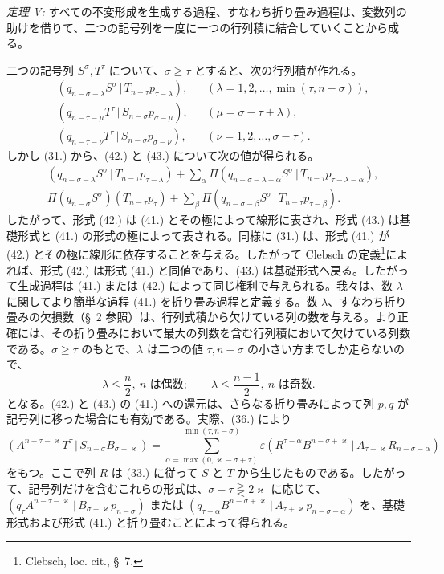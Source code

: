 \documentclass[11pt]{article}
\newcommand{\pair}[2]{(#1\,|\,#2)}
\newcommand{\eps}{\varepsilon}
\begin{document}
\emph{定理 V:} すべての不変形成を生成する過程、すなわち折り畳み過程は、変数列の助けを借りて、二つの記号列を一度に一つの行列積に結合していくことから成る。

二つの記号列 $S^\sigma,T^\tau$ について、$\sigma\ge\tau$ とすると、次の行列積が作れる。
\begin{align}
&\pair{q_{n-\sigma-\lambda}S^\sigma}{T_{n-\tau}p_{\tau-\lambda}}, &&(\lambda=1,2,\ldots,\min(\tau,n-\sigma)),\tag{41}\\
&\pair{q_{n-\tau-\mu}T^\tau}{S_{n-\sigma}p_{\sigma-\mu}}, &&(\mu=\sigma-\tau+\lambda),\tag{42}\\
&\pair{q_{n-\tau-\nu}T^\tau}{S_{n-\sigma}p_{\sigma-\nu}}, &&(\nu=1,2,\ldots,\sigma-\tau).
\tag{43}
\end{align}
しかし (31.) から、(42.) と (43.) について次の値が得られる。
\begin{align}
&\pair{q_{n-\sigma-\lambda}S^\sigma}{T_{n-\tau}p_{\tau-\lambda}}
 +\sum_{\alpha}\Pi\pair{q_{n-\sigma-\lambda-\alpha}S^\sigma}{T_{n-\tau}p_{\tau-\lambda-\alpha}},\tag{42a}\\
&\Pi(q_{n-\sigma}S^\sigma)(T_{n-\tau}p_\tau)
 +\sum_{\beta}\Pi\pair{q_{n-\sigma-\beta}S^\sigma}{T_{n-\tau}p_{\tau-\beta}}.
\tag{43a}
\end{align}
したがって、形式 (42.) は (41.) とその極によって線形に表され、形式 (43.) は基礎形式と (41.) の形式の極によって表される。同様に (31.) は、形式 (41.) が (42.) とその極に線形に依存することを与える。したがって Clebsch の定義\footnote{Clebsch, loc. cit., \S\ 7.}によれば、形式 (42.) は形式 (41.) と同値であり、(43.) は基礎形式へ戻る。したがって生成過程は (41.) または (42.) によって同じ権利で与えられる。我々は、数 $\lambda$ に関してより簡単な過程 (41.) を折り畳み過程と定義する。数 $\lambda$、すなわち折り畳みの欠損数（\S\ 2 参照）は、行列式積から欠けている列の数を与える。より正確には、その折り畳みにおいて最大の列数を含む行列積において欠けている列数である。$\sigma\ge\tau$ のもとで、$\lambda$ は二つの値 $\tau,n-\sigma$ の小さい方までしか走らないので、
\begin{equation}
 \lambda\le\frac n2,\ n\text{ は偶数};\qquad
 \lambda\le\frac{n-1}{2},\ n\text{ は奇数}.
\tag{44}
\end{equation}
となる。(42.) と (43.) の (41.) への還元は、さらなる折り畳みによって列 $p,q$ が記号列に移った場合にも有効である。実際、(36.) により
\[
 \pair{A^{n-\tau-\varkappa}T^\tau}{S_{n-\sigma}B_{\sigma-\varkappa}}
 =\sum_{\alpha=\max(0,\varkappa-\sigma+\tau)}^{\min(\tau,n-\sigma)}
 \eps\pair{R^{\tau-\alpha}B^{n-\sigma+\varkappa}}{A_{\tau+\varkappa}R_{n-\sigma-\alpha}}
\]
をもつ。ここで列 $R$ は (33.) に従って $S$ と $T$ から生じたものである。したがって、記号列だけを含むこれらの形式は、$\sigma-\tau\gtreqless 2\varkappa$ に応じて、$\pair{q_\tau A^{n-\tau-\varkappa}}{B_{\sigma-\varkappa}p_{n-\sigma}}$ または $\pair{q_{\tau-\alpha}B^{n-\sigma+\varkappa}}{A_{\tau+\varkappa}p_{n-\sigma-\alpha}}$ を、基礎形式および形式 (41.) と折り畳むことによって得られる。
\end{document}
